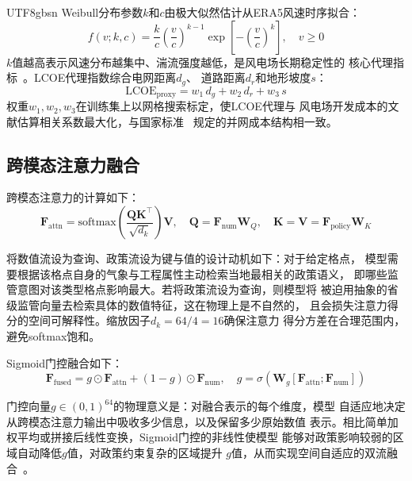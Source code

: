 \documentclass[12pt, a4paper]{article}
\begin{document}
\begin{CJK}{UTF8}{gbsn}
Weibull分布参数$k$和$c$由极大似然估计从ERA5风速时序拟合：
\begin{equation}
f(v;k,c) = \frac{k}{c}\left(\frac{v}{c}\right)^{k-1}
\exp\!\left[-\left(\frac{v}{c}\right)^k\right], \quad v\geq0
\label{eq:weibull}
\end{equation}
$k$值越高表示风速分布越集中、湍流强度越低，是风电场长期稳定性的
核心代理指标~\cite{jung2021}。LCOE代理指数综合电网距离$d_g$、
道路距离$d_r$和地形坡度$s$：
\begin{equation}
\text{LCOE}_{\text{proxy}} = w_1\,d_g + w_2\,d_r + w_3\,s
\label{eq:lcoe}
\end{equation}
权重$w_1,w_2,w_3$在训练集上以网格搜索标定，使LCOE代理与
风电场开发成本的文献估算相关系数最大化，与国家标准~\cite{gbt19963}
规定的并网成本结构相一致。

\subsection{跨模态注意力融合}

跨模态注意力的计算如下：
\begin{equation}
\mathbf{F}_\text{attn} =
  \text{softmax}\!\left(\frac{\mathbf{Q}\mathbf{K}^\top}{\sqrt{d_k}}
  \right)\mathbf{V},
\quad
\mathbf{Q}=\mathbf{F}_\text{num}\mathbf{W}_Q,
\quad
\mathbf{K}=\mathbf{V}=\mathbf{F}_\text{policy}\mathbf{W}_K
\label{eq:cross_attn}
\end{equation}

将数值流设为查询、政策流设为键与值的设计动机如下：对于给定格点，
模型需要根据该格点自身的气象与工程属性主动检索当地最相关的政策语义，
即哪些监管意图对该类型格点影响最大。若将政策流设为查询，则模型将
被迫用抽象的省级监管向量去检索具体的数值特征，这在物理上是不自然的，
且会损失注意力得分的空间可解释性。缩放因子$d_k=64/4=16$确保注意力
得分方差在合理范围内，避免softmax饱和。

Sigmoid门控融合如下：
\begin{equation}
\mathbf{F}_\text{fused} =
  g \odot \mathbf{F}_\text{attn} +
  (1-g) \odot \mathbf{F}_\text{num},
\quad
g=\sigma\!\left(\mathbf{W}_g[\mathbf{F}_\text{attn};
\mathbf{F}_\text{num}]\right)
\label{eq:gating}
\end{equation}

门控向量$g \in (0,1)^{64}$的物理意义是：对融合表示的每个维度，模型
自适应地决定从跨模态注意力输出中吸收多少信息，以及保留多少原始数值
表示。相比简单加权平均或拼接后线性变换，Sigmoid门控的非线性使模型
能够对政策影响较弱的区域自动降低$g$值，对政策约束复杂的区域提升
$g$值，从而实现空间自适应的双流融合~\cite{qiu2025gated}。


\end{CJK}
\end{document}
